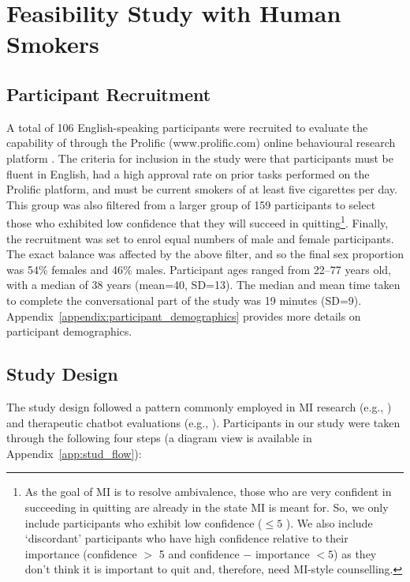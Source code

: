 \section{Feasibility Study with Human Smokers}
\label{sec:feasability_study}
\subsection{Participant Recruitment}
\label{sec:recruitment}
A total of 106 English-speaking participants were recruited to evaluate the capability of \sysname through the Prolific (www.prolific.com) online behavioural research platform \cite{peer2017beyond}. The criteria for inclusion in the study were that participants must be fluent in English, had a high approval rate on prior tasks performed on the Prolific platform, and must be current smokers of at least five cigarettes per day. This group was also filtered from a larger group of 159 participants to select those who exhibited low confidence that they will succeed in quitting\footnote{
As the goal of MI is to resolve ambivalence, those who are very confident in succeeding in quitting are already in the state MI is meant for. So, we only include participants who exhibit low confidence ($\leq 5$ ). We also include `discordant' participants who have high confidence relative to their importance (confidence $>$ 5 and confidence $-$ importance $< 5$) as they don't think it is important to quit and, therefore, need MI-style counselling.}. Finally, the recruitment was set to enrol equal numbers of male and female participants. The exact balance was affected by the above filter, and so the final sex proportion was 54\% females and 46\% males. Participant ages ranged from 22–77 years old, with a median of 38 years (mean=40, SD=13). The median and mean time taken to complete the conversational part of the study was 19 minutes (SD=9). Appendix~\ref{appendix:participant_demographics} provides more details on participant demographics.

\subsection{Study Design}
\label{sec:evaluation}
The study design followed a pattern commonly employed in MI research (e.g., \citealp{Valanis2001, doi:10.15288/jsads.2009.s16.106, 10.1093/alcalc/agw047, browne2022motivation, james2021improving}) and therapeutic chatbot evaluations (e.g., \citealp{info:doi/10.2196/49132, He2022}). Participants in our study were taken through the following four steps (a diagram view is available in Appendix~\ref{app:stud_flow}):\vspace{-0.2em}

